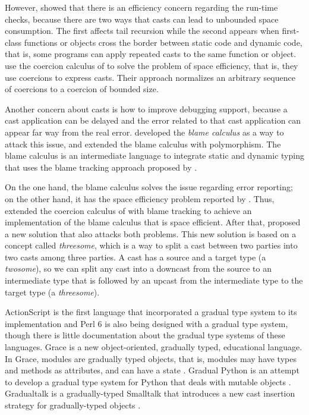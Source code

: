 \documentclass[preprint]{sig-alternate}
\begin{document}
However, \citet{herman2007sgt} showed that there is an efficiency
concern regarding the run-time checks, because there are two
ways that casts can lead to unbounded space consumption.
The first affects tail recursion while the second appears when
first-class functions or objects cross the border between
static code and dynamic code, that is, some programs can apply
repeated casts to the same function or object.
\citet{herman2007sgt} use the coercion calculus of
\citet{henglein1994dts} to solve the problem of space efficiency,
that is, they use coercions to express casts.
Their approach normalizes an arbitrary sequence of coercions to a
coercion of bounded size.

Another concern about casts is how to improve debugging support,
because a cast application can be delayed and the error related
to that cast application can appear far way from the real error.
\citet{wadler2009wpc} developed the \textit{blame calculus} as a way
to attack this issue, and \citet{ahmed2011bfa} extended the
blame calculus with polymorphism.
The blame calculus is an intermediate language to integrate
static and dynamic typing that uses the blame tracking approach
proposed by \citet{findler2002chf}.

On the one hand, the blame calculus solves the issue regarding
error reporting;
on the other hand, it has the space efficiency problem reported
by \citet{herman2007sgt}.
Thus, \citet{siek2009casts} extended the coercion calculus of
\citet{herman2007sgt} with blame tracking to achieve an
implementation of the blame calculus that is space efficient.
After that, \citet{siek2010blame} proposed a new solution that also
attacks both problems.
This new solution is based on a concept called \textit{threesome},
which is a way to split a cast between two parties into two casts
among three parties.
A cast has a source and a target type (a \textit{twosome}),
so we can split any cast into a downcast from the source to an
intermediate type that is followed by an upcast from the intermediate
type to the target type (a \textit{threesome}).

ActionScript \citep{moock2007as3} is the first language that
incorporated a gradual type system to its implementation and
Perl 6 \citep{tang2007pri} is also being designed with a
gradual type system, though there is little documentation about
the gradual type systems of these languages.
Grace \citep{black2012grace,black2013sg} is a new object-oriented,
gradually typed, educational language.
In Grace, modules are gradually typed objects, that is, modules
may have types and methods as attributes, and can have a state
\citep{homer2013modules}.
Gradual Python \citep{reticulated} is an attempt to develop a
gradual type system for Python that deals with mutable objects
\citep{siek2013mutable}.
Gradualtalk \citep{allende2013gts} is a gradually-typed Smalltalk
that introduces a new cast insertion strategy for gradually-typed
objects \citep{allende2013cis}.
\end{document}
